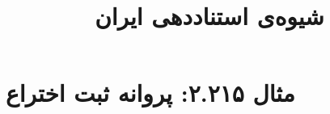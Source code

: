 \documentclass[a4paper,10pt]{article}
\begin{document}
\title{شیوه‌ی استناددهی ایران
 }
\author{}
\date{}
\maketitle



\section*{مثال ۲.۲۱۵: پروانه ثبت اختراع}

\cite{علیزاده1384}\\
\cite{petroff1980}\\






\end{document}
